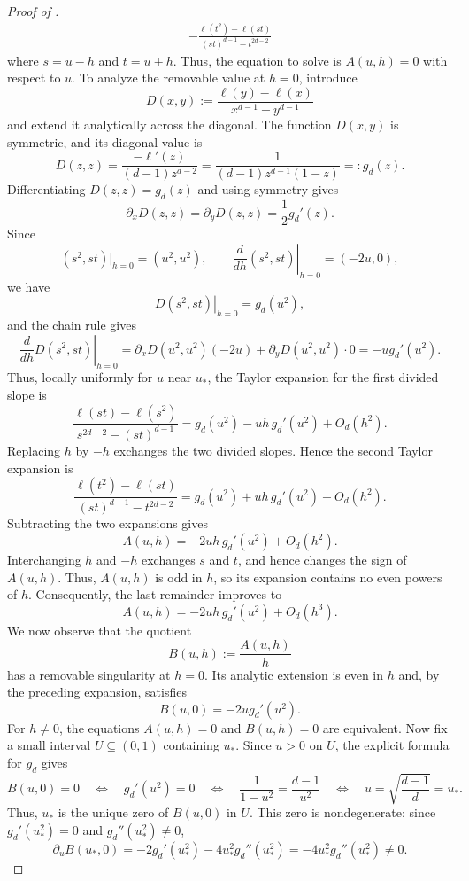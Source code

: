 \begin{proof}[Proof of ]
\begin{equation*}
\begin{aligned}
    -\frac{\ell(t^2)-\ell(st)}
            {(st)^{d-1}-t^{2d-2}}
\end{aligned}
\end{equation*}
where $s=u-h$ and $t=u+h$.
Thus, the equation to solve is $A(u,h)=0$ with respect to $u$.
To analyze
the removable value at $h=0$, introduce
\[
  D(x,y):=\frac{\ell(y)-\ell(x)}{x^{d-1}-y^{d-1}}
\]
and extend it analytically across the diagonal.  The function $D(x,y)$ is
symmetric, and its diagonal value is
\[
  D(z,z)
  =\frac{-\ell'(z)}{(d-1)z^{d-2}}
  =\frac1{(d-1)z^{d-1}(1-z)}
  =:g_d(z).
\]
Differentiating $D(z,z)=g_d(z)$ and using symmetry gives
\[
  \partial_xD(z,z)=\partial_yD(z,z)=\frac12g_d'(z).
\]
Since
\[
  (s^2,st)\big|_{h=0}=(u^2,u^2),
  \qquad
  \left.\frac{d}{dh}(s^2,st)\right|_{h=0}=(-2u,0),
\]
we have
\[
  \left.D(s^2,st)\right|_{h=0}=g_d(u^2),
\]
and the chain rule gives
\[
  \left.\frac{d}{dh}D(s^2,st)\right|_{h=0}
  =\partial_xD(u^2,u^2)(-2u)+\partial_yD(u^2,u^2)\cdot0
  =-u g_d'(u^2).
\]
Thus, locally uniformly for $u$ near $u_*$, the Taylor expansion for the first
divided slope is
\[
  \frac{\ell(st)-\ell(s^2)}{s^{2d-2}-(st)^{d-1}}
  =g_d(u^2)-uh\,g_d'(u^2)+O_d(h^2).
\]
Replacing $h$ by $-h$ exchanges the two divided slopes.  Hence the second
Taylor expansion is
\[
  \frac{\ell(t^2)-\ell(st)}{(st)^{d-1}-t^{2d-2}}
  =g_d(u^2)+uh\,g_d'(u^2)+O_d(h^2).
\]
Subtracting the two expansions gives
\[
  A(u,h)=-2uh\,g_d'(u^2)+O_d(h^2).
\]
Interchanging $h$ and $-h$ exchanges $s$ and $t$, and hence changes the sign
of $A(u,h)$.  Thus, $A(u,h)$ is odd in $h$, so its expansion contains no
even powers of $h$.  Consequently, the last remainder improves to
\begin{equation*}
  A(u,h)=-2uh\,g_d'(u^2)+O_d(h^3).
\end{equation*}
We now observe that the quotient
\[
  B(u,h):=\frac{A(u,h)}{h}
\]
has a removable singularity at $h=0$.  Its analytic extension is even in
$h$ and, by the preceding expansion, satisfies
\[
  B(u,0)=-2u g_d'(u^2).
\]
For $h\ne0$, the equations $A(u,h)=0$ and $B(u,h)=0$ are equivalent.
Now fix a small interval $U\subseteq(0,1)$ containing $u_*$.  Since $u>0$ on
$U$, the explicit formula for $g_d$ gives
\[
  B(u,0)=0
  \quad\Longleftrightarrow\quad
  g_d'(u^2)=0
  \quad\Longleftrightarrow\quad
  \frac1{1-u^2}=\frac{d-1}{u^2}
  \quad\Longleftrightarrow\quad
  u=\sqrt{\frac{d-1}{d}}=u_*.
\]
Thus, $u_*$ is the unique zero of $B(u,0)$ in $U$.  This zero is
nondegenerate: since $g_d'(u_*^2)=0$ and $g_d''(u_*^2)\ne0$,
\[
  \partial_uB(u_*,0)
  =-2g_d'(u_*^2)-4u_*^2g_d''(u_*^2)
  =-4u_*^2g_d''(u_*^2)\ne0.
\]
\end{proof}
